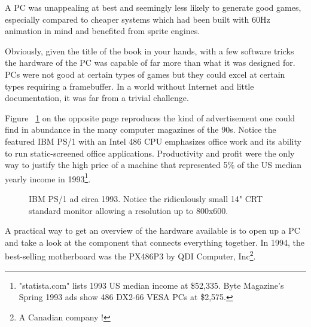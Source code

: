 \par
 A PC was unappealing at best and seemingly less likely to generate good games, especially compared to cheaper systems which had been built with 60Hz animation in mind and benefited from sprite engines.\\
 \par
  Obviously, given the title of the book in your hands, with a few software tricks the hardware of the PC was capable of far more than what it was designed for. PCs were not good at certain types of games but they could excel at certain types requiring a framebuffer. In a world without Internet and little documentation, it was far from a trivial challenge.\\
\par

Figure ~\ref{ibm_ps1_top} on the opposite page reproduces the kind of advertisement one could find in abundance in the many computer magazines of the 90s. Notice the featured IBM PS/1 with an Intel 486 CPU emphasizes office work and its ability to run static-screened office applications. Productivity and profit were the only way to justify the high price of a machine that represented 5\% of the US median yearly income in 1993\footnote{ "statista.com" lists 1993 US median income at \$52,335. Byte Magazine's Spring 1993 ads show 486 DX2-66 VESA PCs at \$2,575.}.\\
\par

\par
\begin{figure}[H] \centering
{}
\caption{IBM PS/1 ad circa 1993. Notice the ridiculously small 14" CRT standard monitor allowing a resolution up to 800x600.}
\label{ibm_ps1_top}
\end{figure}


















\cleartoleftpage
 
A practical way to get an overview of the hardware available is to open up a PC and take a look at the component that connects everything together. In 1994, the best-selling motherboard was the PX486P3 by QDI Computer, Inc\footnote{A Canadian company  !}.\\

